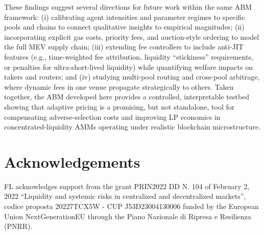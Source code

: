 \documentclass[11pt]{article}
\begin{document}
These findings suggest several directions for future work within the same ABM framework: (i) calibrating agent 
intensities and parameter regimes to specific pools and chains to connect qualitative insights to empirical magnitudes; 
(ii) incorporating explicit gas costs, priority fees, and auction-style ordering to model the full MEV supply chain; 
(iii) extending fee controllers to include anti-JIT features (e.g., time-weighted fee attribution, liquidity “stickiness” 
requirements, or penalties for ultra-short-lived liquidity) while quantifying welfare impacts on takers and routers; 
and (iv) studying multi-pool routing and cross-pool arbitrage, where dynamic fees in one venue propagate strategically 
to others. Taken together, the ABM developed here provides a controlled, interpretable testbed showing that adaptive
pricing is a promising, but not standalone, tool for compensating adverse-selection costs and improving LP economics in
concentrated-liquidity AMMs operating under realistic blockchain microstructure.

\section*{Acknowledgements}
    FL acknowledges support from the grant PRIN2022 DD N. 104 of February 2, 2022 ``Liquidity and systemic risks in centralized and decentralized markets'', codice proposta 20227TCX5W - CUP J53D23004130006 funded by the European Union NextGenerationEU through the Piano Nazionale di Ripresa e Resilienza (PNRR).


\FloatBarrier




\end{document}
